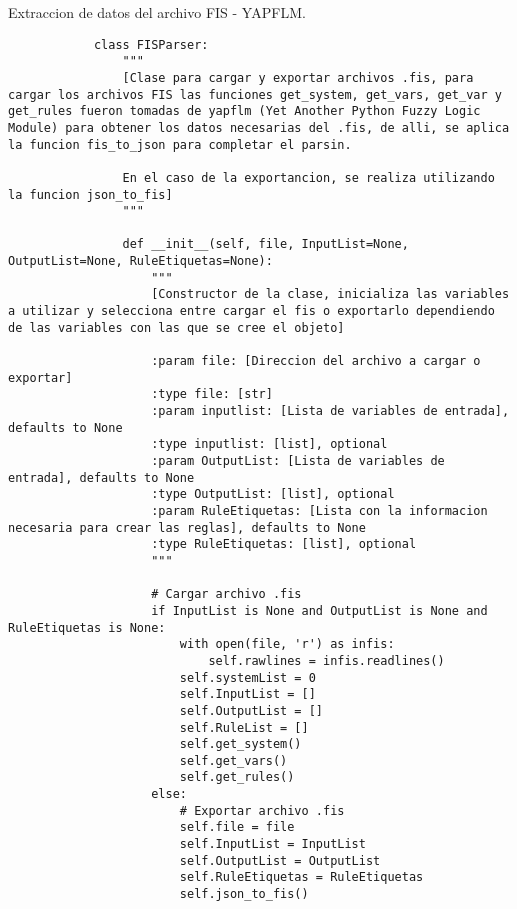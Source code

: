     \begin{longlisting}
        \caption[Extraccion de datos del archivo FIS - YAPFLM]{Extraccion de datos del archivo FIS - YAPFLM.}
        \label{code:anexoF1}				
        \begin{verbatim}
            class FISParser:
                """
                [Clase para cargar y exportar archivos .fis, para cargar los archivos FIS las funciones get_system, get_vars, get_var y get_rules fueron tomadas de yapflm (Yet Another Python Fuzzy Logic Module) para obtener los datos necesarias del .fis, de alli, se aplica la funcion fis_to_json para completar el parsin.
                
                En el caso de la exportancion, se realiza utilizando la funcion json_to_fis]
                """

                def __init__(self, file, InputList=None, OutputList=None, RuleEtiquetas=None):
                    """
                    [Constructor de la clase, inicializa las variables a utilizar y selecciona entre cargar el fis o exportarlo dependiendo de las variables con las que se cree el objeto]
                    
                    :param file: [Direccion del archivo a cargar o exportar]
                    :type file: [str]
                    :param inputlist: [Lista de variables de entrada], defaults to None
                    :type inputlist: [list], optional
                    :param OutputList: [Lista de variables de entrada], defaults to None
                    :type OutputList: [list], optional
                    :param RuleEtiquetas: [Lista con la informacion necesaria para crear las reglas], defaults to None
                    :type RuleEtiquetas: [list], optional
                    """

                    # Cargar archivo .fis
                    if InputList is None and OutputList is None and RuleEtiquetas is None:
                        with open(file, 'r') as infis:
                            self.rawlines = infis.readlines()
                        self.systemList = 0
                        self.InputList = []
                        self.OutputList = []
                        self.RuleList = []
                        self.get_system()
                        self.get_vars()
                        self.get_rules()
                    else:
                        # Exportar archivo .fis
                        self.file = file
                        self.InputList = InputList
                        self.OutputList = OutputList
                        self.RuleEtiquetas = RuleEtiquetas
                        self.json_to_fis()


\end{verbatim}
\end{longlisting}
